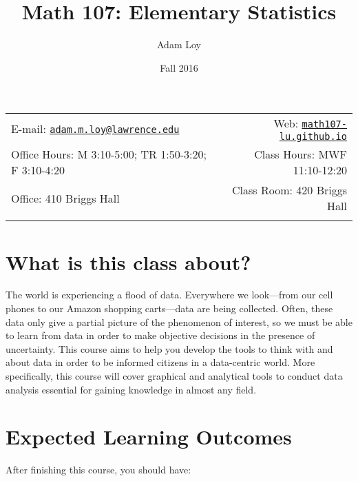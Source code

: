 \documentclass[11pt,]{article}
\title{Math 107: Elementary Statistics}
\author{Adam Loy}
\date{Fall 2016}
\begin{document}
  

		\maketitle
		
	
		\thispagestyle{firststyle}



	\noindent \begin{tabular*}{\textwidth}{ @{\extracolsep{\fill}} lr @{\extracolsep{\fill}}}


E-mail: \texttt{\href{mailto:adam.m.loy@lawrence.edu}{\nolinkurl{adam.m.loy@lawrence.edu}}} & Web: \href{http://math107-lu.github.io}{\tt math107-lu.github.io}\\
Office Hours: M 3:10-5:00; TR 1:50-3:20; F 3:10-4:20  &  Class Hours: MWF 11:10-12:20\\
Office: 410 Briggs Hall  & Class Room: 420 Briggs Hall\\
	&  \\
	\hline
	\end{tabular*}
	
\vspace{2mm}
	


\section{What is this class about?}\label{what-is-this-class-about}

The world is experiencing a flood of data. Everywhere we look---from our
cell phones to our Amazon shopping carts---data are being collected.
Often, these data only give a partial picture of the phenomenon of
interest, so we must be able to learn from data in order to make
objective decisions in the presence of uncertainty. This course aims to
help you develop the tools to think with and about data in order to be
informed citizens in a data-centric world. More specifically, this
course will cover graphical and analytical tools to conduct data
analysis essential for gaining knowledge in almost any field.

\section{Expected Learning Outcomes}\label{expected-learning-outcomes}

After finishing this course, you should have:
\end{document}
